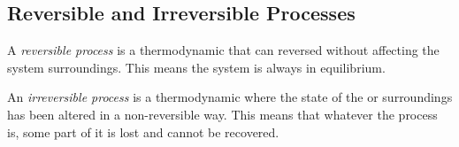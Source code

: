 \subsection{Reversible and Irreversible Processes}\label{subsec:Reversible_Irreversible_Processes}
\begin{definition}\label{def:Reversible_Process}
  A \emph{reversible process} is a thermodynamic  that can reversed without affecting the system surroundings.
  This means the system is always in equilibrium.
\end{definition}

\begin{definition}\label{def:Irreversible_Process}
  An \emph{irreversible process} is a thermodynamic  where the state of the  or surroundings has been altered in a non-reversible way.
  This means that whatever the process is, some part of it is lost and cannot be recovered.
\end{definition}



